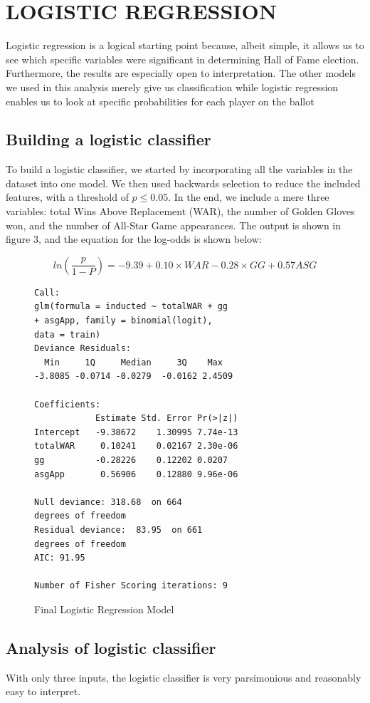 \documentclass[letterpaper, 10 pt, conference]{ieeeconf}
\begin{document}
\section{LOGISTIC REGRESSION}
Logistic regression is a logical starting point because, albeit simple, it allows us to see which specific variables were significant in determining Hall of Fame election. Furthermore, the results are especially open to interpretation. The other models we used in this analysis merely give us classification while logistic regression enables us to look at specific probabilities for each player on the ballot

\subsection{Building a logistic classifier}
To build a logistic classifier, we started by incorporating all the variables in the dataset into one model. We then used backwards selection to reduce the included features, with a threshold of $p \leq 0.05$. In the end, we include a mere three variables: total Wins Above Replacement (WAR), the number of Golden Gloves won, and the number of All-Star Game appearances. The output is shown in figure 3, and the equation for the log-odds is shown below:

$$ln(\frac{p}{1-P})= -9.39 + 0.10 \times WAR - 0.28 \times GG + 0.57 ASG$$

\begin{figure}[thpb]
\caption{Final Logistic Regression Model}
\begin{Verbatim}[frame=single]
Call:
glm(formula = inducted ~ totalWAR + gg 
+ asgApp, family = binomial(logit), 
data = train) 
Deviance Residuals: 
  Min     1Q     Median     3Q    Max  
-3.8085 -0.0714 -0.0279  -0.0162 2.4509  

Coefficients:
            Estimate Std. Error Pr(>|z|)  
Intercept   -9.38672    1.30995 7.74e-13
totalWAR     0.10241    0.02167 2.30e-06
gg          -0.28226    0.12202 0.0207 
asgApp       0.56906    0.12880 9.96e-06
 
Null deviance: 318.68  on 664
degrees of freedom
Residual deviance:  83.95  on 661  
degrees of freedom
AIC: 91.95
 
Number of Fisher Scoring iterations: 9
\end{Verbatim}
\end{figure}

\subsection{Analysis of logistic classifier}
With only three inputs, the logistic classifier is very parsimonious and reasonably easy to interpret.
\end{document}
